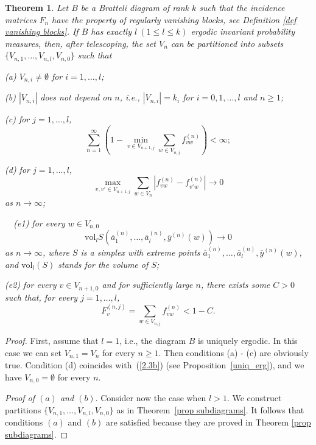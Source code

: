 \documentclass[11pt, english, reqno]{amsart}
\theoremstyle{definition}
\theoremstyle{remark}
\theoremstyle{plain}
\newtheorem{thm}[defin]{Theorem}
\def\ov{\overline}
\numberwithin{equation}{section}
\begin{document}
{\begin{thm}\label{main1} Let $B$ be a Bratteli diagram of rank $k$ such
that the incidence matrices $F_n$ have the property of regularly vanishing
blocks, see Definition \ref{def vanishing blocks}. If $B$ has exactly
$l\ (1 \leq l \leq k)$ ergodic invariant probability measures, then, after
 telescoping, the set $V_n$ can be partitioned into subsets $\{V_{n,1},
 \ldots,V_{n,l},V_{n,0}\}$  such that

\smallskip
(a) $V_{n,i} \neq \emptyset$ for $i = 1,\ldots,l$;

\smallskip
(b) $|V_{n,i}|$ does not depend on $n$, i.e.,
$|V_{n,i}| = k_i$ for $i = 0,1, \ldots,l$ and $n \geq 1$;

\smallskip
(c) for $j = 1,\ldots,l$,
$$
\sum_{n = 1}^\infty \left(1 - \min_{v \in V_{n+1,j}}\sum_{w \in V_{n,j}}
f_{vw}^{(n)}\right)< \infty;
$$

\smallskip
(d)  for $j = 1,\ldots,l$,
$$
\max_{v,v' \in V_{n+1,j}} \sum_{w \in V_{n}} \left|f_{vw}^{(n)} -
f_{v'w}^{(n)}\right| \rightarrow 0
$$
as $n \rightarrow \infty$;

\smallskip


\ \ (e1)
for every $w \in V_{n,0}$
$$
\mathrm{vol}_{l} S(\ov a_1^{(n)}, \ldots, \ov a_l^{(n)}, \ov y^{(n)}(w))
 \rightarrow 0
$$
as $n \rightarrow \infty$, where $S$ is a simplex with extreme points
$\ov a_1^{(n)}, \ldots, \ov a_l^{(n)}, \ov y^{(n)}(w)$, and
$\mathrm{vol}_l(S)$ stands for the volume of $S$;

 (e2) for every $v \in V_{n+1,0}$ and  for sufficiently large $n$,
there exists some $C>0$ such that, for every $j = 1, \ldots,l$,
$$F_v^{(n,j)} =  \sum_{w  \in V_{n,j}}  f_{vw}^{(n)} < 1 -C.
$$

\end{thm}

\begin{proof} First, assume that $l = 1$, i.e., the diagram $B$ is uniquely
 ergodic. In this case we can set $V_{n,1} = V_n$ for every $n \geq 1$.
  Then  conditions (a) - (c) are obviously true. Condition (d) coincides
 with~(\ref{2.3b}) (see Proposition~\ref{uniq_erg}), and we have $V_{n,0} =
 \emptyset$ for  every $n$.

\textit{Proof of $(a)$ and $(b)$}.
Consider now the case when  $l > 1$. We construct partitions $\{V_{n,1},
\ldots,V_{n,l},V_{n,0}\}$ as in Theorem~\ref{prop subdiagrams}. It
follows that conditions $(a)$ and $(b)$ are  satisfied because they are
proved in Theorem \ref{prop subdiagrams}.


\end{proof}}
\end{document}
